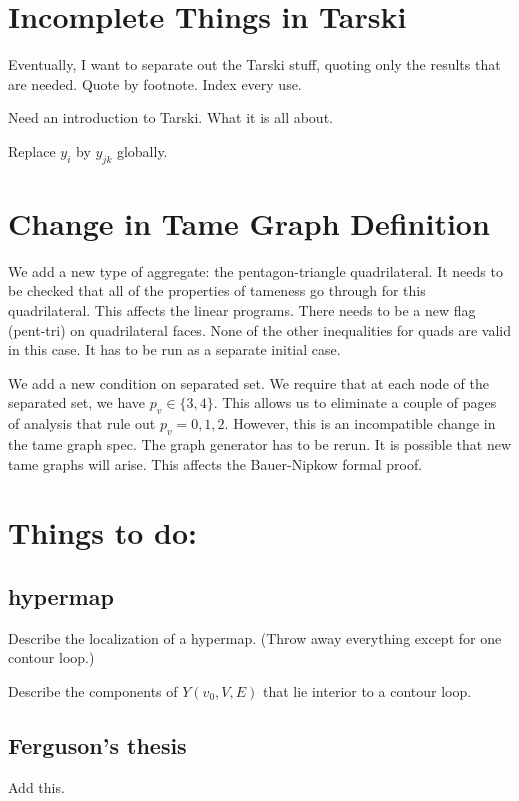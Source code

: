 \section{Incomplete Things in Tarski}

Eventually, I want to separate out the Tarski stuff, quoting
only the results that are needed.  Quote by footnote. Index every use.

Need an introduction to Tarski. What it is all about.

Replace $y_i$ by $y_{jk}$ globally.


\section{Change in Tame Graph Definition}

We add a new type of aggregate: the pentagon-triangle quadrilateral.
It needs to be checked that all of the properties of tameness go
through for this quadrilateral.  This affects the linear programs.
There needs to be a new flag (pent-tri) on quadrilateral faces.
None of the other inequalities for quads are valid in this case.
It has to be run as a separate initial case.

We add a new condition on separated set.  We require that 
at each node of the separated set, we have $p_v\in\{3,4\}$.
This allows us to eliminate a couple of pages of analysis
that rule out $p_v=0,1,2$.  However, this is an incompatible
change in the tame graph spec.  The graph generator has to
be rerun.  It is possible that new tame graphs will arise.
This affects the Bauer-Nipkow formal proof.

\section{Things to do:}

\subsection{hypermap}
Describe the localization of a hypermap.  (Throw away everything
except for one contour loop.)

Describe the components of $Y(v_0,V,E)$ that lie interior to
a contour loop.  


\subsection{Ferguson's thesis}

Add this.



